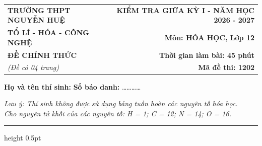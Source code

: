 \documentclass[11pt,a4paper]{article}
\begin{document}
\noindent
\begin{tabularx}{\textwidth}{@{}X r@{}}
\textbf{TRƯỜNG THPT NGUYỄN HUỆ} & \textbf{KIỂM TRA GIỮA KỲ I - NĂM HỌC 2026 - 2027} \\
\textbf{TỔ LÍ - HÓA - CÔNG NGHỆ} & \textbf{Môn: HÓA HỌC, Lớp 12} \\
\textbf{ĐỀ CHÍNH THỨC} & \textbf{Thời gian làm bài: 45 phút} \\
\textit{(Đề có 04 trang)} & \textbf{Mã đề thi: 1202}
\end{tabularx}

\vspace{2pt}
\noindent\textbf{Họ và tên thí sinh:} \dotfill \textbf{Số báo danh:} \dots\dots\dots\dots

\vspace{2pt}
\noindent\textit{Lưu ý: Thí sinh không được sử dụng bảng tuần hoàn các nguyên tố hóa học.} \\
\textit{Cho nguyên tử khối của các nguyên tố: H = 1; C = 12; N = 14; O = 16.}
\vspace{2pt}
\hrule height 0.5pt
\vspace{6pt}

\vspace{4pt}
\end{document}
